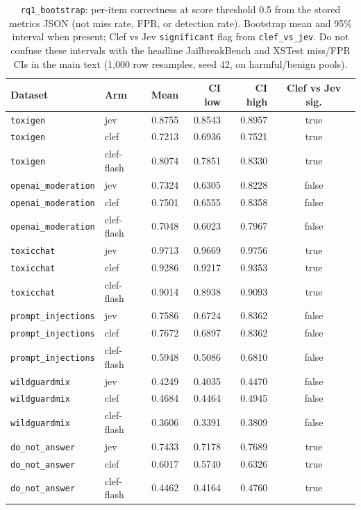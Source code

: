 \begin{table}[htbp]
\centering
\caption{\texttt{rq1\_bootstrap}: per-item correctness at score threshold 0.5 from the stored metrics JSON (not miss rate, FPR, or detection rate). Bootstrap mean and 95\% interval when present; Clef vs Jev \texttt{significant} flag from \texttt{clef\_vs\_jev}. Do not confuse these intervals with the headline JailbreakBench and XSTest miss/FPR CIs in the main text (1{,}000 row resamples, seed 42, on harmful/benign pools).}
\label{tab:rq1-bootstrap}
\footnotesize
\begin{tabular}{@{}llrrrc@{}}
\toprule
Dataset & Arm & Mean & CI low & CI high & Clef vs Jev sig. \\
\midrule
\texttt{toxigen} & jev & 0.8755 & 0.8543 & 0.8957 & true \\
\texttt{toxigen} & clef & 0.7213 & 0.6936 & 0.7521 & true \\
\texttt{toxigen} & clef-flash & 0.8074 & 0.7851 & 0.8330 & true \\
\texttt{openai\_moderation} & jev & 0.7324 & 0.6305 & 0.8228 & false \\
\texttt{openai\_moderation} & clef & 0.7501 & 0.6555 & 0.8358 & false \\
\texttt{openai\_moderation} & clef-flash & 0.7048 & 0.6023 & 0.7967 & false \\
\texttt{toxicchat} & jev & 0.9713 & 0.9669 & 0.9756 & true \\
\texttt{toxicchat} & clef & 0.9286 & 0.9217 & 0.9353 & true \\
\texttt{toxicchat} & clef-flash & 0.9014 & 0.8938 & 0.9093 & true \\
\texttt{prompt\_injections} & jev & 0.7586 & 0.6724 & 0.8362 & false \\
\texttt{prompt\_injections} & clef & 0.7672 & 0.6897 & 0.8362 & false \\
\texttt{prompt\_injections} & clef-flash & 0.5948 & 0.5086 & 0.6810 & false \\
\texttt{wildguardmix} & jev & 0.4249 & 0.4035 & 0.4470 & false \\
\texttt{wildguardmix} & clef & 0.4684 & 0.4464 & 0.4945 & false \\
\texttt{wildguardmix} & clef-flash & 0.3606 & 0.3391 & 0.3809 & false \\
\texttt{do\_not\_answer} & jev & 0.7433 & 0.7178 & 0.7689 & true \\
\texttt{do\_not\_answer} & clef & 0.6017 & 0.5740 & 0.6326 & true \\
\texttt{do\_not\_answer} & clef-flash & 0.4462 & 0.4164 & 0.4760 & true \\

\end{tabular}
\end{table}
